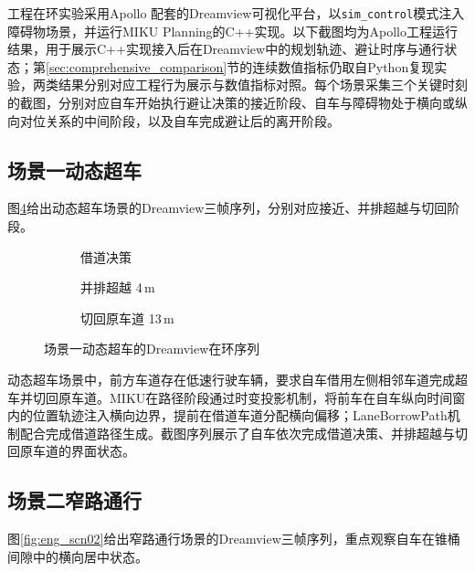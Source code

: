 工程在环实验采用Apollo \SoftwareApollo 配套的Dreamview可视化平台，以\texttt{sim\_control}模式注入障碍物场景，并运行MIKU Planning的C++实现。以下截图均为Apollo工程运行结果，用于展示C++实现接入后在Dreamview中的规划轨迹、避让时序与通行状态；第\ref{sec:comprehensive_comparison}节的连续数值指标仍取自Python复现实验，两类结果分别对应工程行为展示与数值指标对照。每个场景采集三个关键时刻的截图，分别对应自车开始执行避让决策的接近阶段、自车与障碍物处于横向或纵向对位关系的中间阶段，以及自车完成避让后的离开阶段。

\subsection{场景一动态超车}

图\ref{fig:eng_scn01}给出动态超车场景的Dreamview三帧序列，分别对应接近、并排超越与切回阶段。

\begin{figure}[H]
\centering
\begin{subfigure}[b]{\textwidth}
  \centering
  
  \caption{借道决策}
  \label{fig:eng_scn01:a}
\end{subfigure}

\begin{subfigure}[b]{\textwidth}
  \centering
  
  \caption{并排超越 4\,m}
  \label{fig:eng_scn01:b}
\end{subfigure}

\begin{subfigure}[b]{\textwidth}
  \centering
  
  \caption{切回原车道 13\,m}
  \label{fig:eng_scn01:c}
\end{subfigure}
\caption{场景一动态超车的Dreamview在环序列}
\label{fig:eng_scn01}
\end{figure}

动态超车场景中，前方车道存在低速行驶车辆，要求自车借用左侧相邻车道完成超车并切回原车道。MIKU在路径阶段通过时变投影机制，将前车在自车纵向时间窗内的位置轨迹注入横向边界，提前在借道车道分配横向偏移；LaneBorrowPath机制配合完成借道路径生成。截图序列展示了自车依次完成借道决策、并排超越与切回原车道的界面状态。

\subsection{场景二窄路通行}

图\ref{fig:eng_scn02}给出窄路通行场景的Dreamview三帧序列，重点观察自车在锥桶间隙中的横向居中状态。

